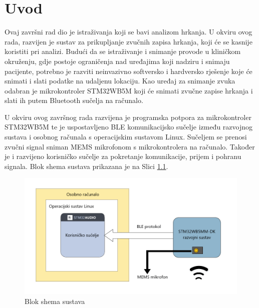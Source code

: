 \chapter{Uvod}


Ovaj završni rad dio je istraživanja koji se bavi analizom hrkanja. U okviru ovog rada, razvijen je sustav za prikupljanje zvučnih zapisa hrkanja, koji će se kasnije koristiti pri analizi. Budući da se istraživanje i snimanje provode u kliničkom okruženju, gdje postoje ograničenja nad uređajima koji nadziru i snimaju pacijente, potrebno je razviti neinvazivno softversko i hardversko rješenje koje će snimati i slati podatke na udaljenu lokaciju. Kao uređaj za snimanje zvuka odabran je mikrokontroler STM32WB5M koji će snimati zvučne zapise hrkanja i slati ih putem Bluetooth sučelja na računalo.  

U okviru ovog završnog rada razvijena je programska potpora za mikrokontroler STM32WB5M te je uspostavljeno BLE komunikacijsko sučelje između razvojnog sustava i osobnog računala s operacijskim sustavom Linux. Sučeljem se prenosi zvučni signal sniman MEMS mikrofonom s mikrokontrolera na računalo. Također je i razvijeno korisničko sučelje za pokretanje komunikacije, prijem i pohranu signala. Blok shema sustava prikazana je na Slici \ref{fig:shema}. 

\begin{figure}[ht]
	\includegraphics[width=\linewidth]{imgs/shema}
	\caption{Blok shema sustava}
	 \label{fig:shema}
\end{figure}

\eject